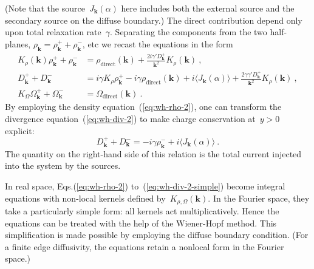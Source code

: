 \documentclass[preprint,aps,eqsecnum]{revtex4-1}
\newcommand{\fplus}[1]{{#1}^{+}}
\newcommand{\fminus}[1]{{#1}^{-}}
\newcommand{\dct}[1]{{#1}_\mathrm{direct}}
\begin{document}
(Note that the source~$J_{\bm k}(\alpha)$ here includes
both the external source and the secondary source on the diffuse boundary.)
The direct contribution depend only upon total relaxation rate~$\gamma$.
Separating the components from the two half-planes,
$\rho_{\bm k} = \fplus{\rho}_{\bm k} + \fminus{\rho}_{\bm k}$, etc we
recast the equations in the form
\begin{align}
  K_\rho({\bm k}) \fplus{\rho}_{\bm k} + \fminus{\rho}_{\bm k}
  &= \dct{\rho}({\bm k})
        + \frac{2 i \gamma' \fplus{D}_{\bm k}}{{\bm k}^2} K_\rho({\bm k})
  \ ,
  \label{eq:wh-rho-2}
 \\
  \fplus{D}_{\bm k} + \fminus{D}_{\bm k} &= i \gamma K_\rho \fplus{\rho}_{\bm k}
  -i \gamma \dct{\rho}({\bm k}) + i \langle J_{\bm k}(\alpha) \rangle
  + \frac{2\gamma\gamma' \fplus{D}_{\bm k}}{{\bm k}^2} K_\rho({\bm k})\ ,
  \label{eq:wh-div-2}
  \\
  K_\Omega\fplus{\Omega}_{\bm k} + \fminus{\Omega}_{\bm k}
  &= \dct{\Omega}({\bm k})
  \ .
  \label{eq:wh-omega-2}
\end{align}
By employing the density equation~(\ref{eq:wh-rho-2}), one can transform
the divergence equation~(\ref{eq:wh-div-2}) to make charge conservation at~$y > 0$ explicit:
\begin{equation}
\label{eq:wh-div-2-simple}
\fplus{D}_{\bm k} + \fminus{D}_{\bm k} = -i \gamma \fminus{\rho}_{\bm k}
+ i \langle J_{\bm k}(\alpha) \rangle \ .
\end{equation}
The quantity on the right-hand side of this relation is the total current
injected into the system by the sources.

In real space, Eqs.(\ref{eq:wh-rho-2}) to~(\ref{eq:wh-div-2-simple})
become integral equations with non-local kernels defined
by~$K_{\rho, \Omega}({\bm k})$. In the Fourier space, they take a particularly
simple form: all kernels act multiplicatively. Hence the equations can be
treated with the help of the Wiener-Hopf method. This simplification is
made possible by employing the diffuse boundary condition. (For a finite
edge diffusivity, the equations retain a nonlocal form in the Fourier space.)
\end{document}
